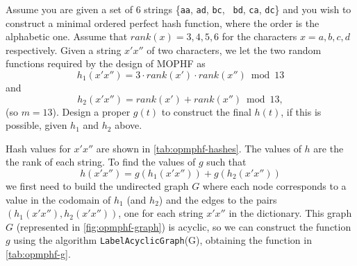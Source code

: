 \exercise

Assume you are given a set of 6 strings \{{\tt aa}, {\tt ad}, {\tt bc}, {\tt
bd}, {\tt ca}, {\tt dc}\} and you wish to construct a minimal ordered perfect
hash function, where the order is the alphabetic one.  Assume that
$rank(x)=3,4,5,6$ for the characters $x=a,b,c,d$ respectively. Given a string
$x'x''$ of two characters, we let the two random functions required by the
design of MOPHF as $$h_1(x'x'') = 3 \cdot rank(x') \cdot rank(x'') \bmod 13$$
and $$h_2(x'x'') = rank(x') + rank(x'') \bmod 13,$$ (so $m = 13$). Design a
proper $g(t)$ to construct the final $h(t)$, if this is possible, given $h_1$
and $h_2$ above.

\solution

Hash values for $x'x''$ are shown in \autoref{tab:opmphf-hashes}. The values of
$h$ are the the rank of each string. To find the values of $g$ such that
$$h(x'x'') = g(h_1(x'x'')) + g(h_2(x'x''))$$ we first need to build the
undirected graph $G$ where each node corresponds to a value in the codomain of
$h_1$ (and $h_2$) and the edges to the pairs $(h_1(x'x''), h_2(x'x''))$, one for
each string $x'x''$ in the dictionary. This graph $G$ (represented in
\autoref{fig:opmphf-graph}) is acyclic, so we can construct the function $g$
using the algorithm {\tt LabelAcyclicGraph}(G), obtaining the function in
\autoref{tab:opmphf-g}.

